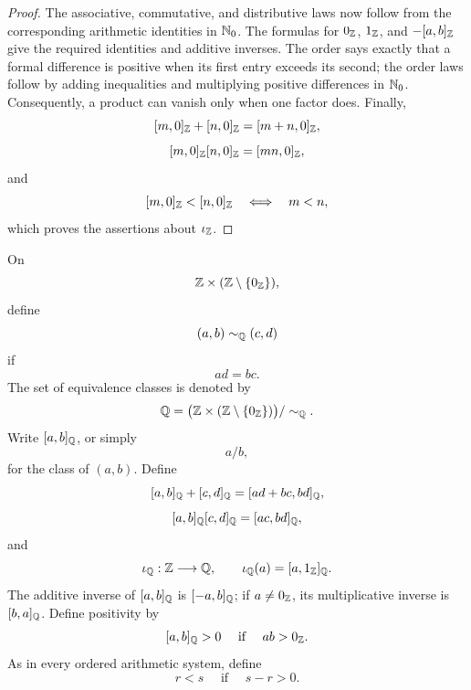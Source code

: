 \begin{proof}
The associative, commutative, and distributive laws now follow from the
corresponding arithmetic identities in \(\mathbb{N}_0\).  The formulas for
\(0_{\mathbb{Z}}\), \(1_{\mathbb{Z}}\), and \(-[a,b]_{\mathbb{Z}}\) give the required identities and
additive inverses.  The order says exactly that a formal difference is
positive when its first entry exceeds its second; the order laws follow by
adding inequalities and multiplying positive differences in \(\mathbb{N}_0\).
Consequently, a product can vanish only when one factor does.  Finally,
\[
[m,0]_{\mathbb{Z}}+[n,0]_{\mathbb{Z}}=[m+n,0]_{\mathbb{Z}},
\]
\[
[m,0]_{\mathbb{Z}}[n,0]_{\mathbb{Z}}=[mn,0]_{\mathbb{Z}},
\]
and
\[
[m,0]_{\mathbb{Z}}< [n,0]_{\mathbb{Z}}
\quad\Longleftrightarrow\quad
m<n,
\]
which proves the assertions about \(\iota_{\mathbb{Z}}\).
\end{proof}

\begin{definition}
On
\[
\mathbb{Z}\times(\mathbb{Z}\setminus\{0_{\mathbb{Z}}\}),
\]
define
\[
(a,b)\sim_{\mathbb{Q}}(c,d)
\]
if
\[
ad=bc.
\]
The set of equivalence classes is denoted by
\[
\mathbb{Q}=\bigl(\mathbb{Z}\times(\mathbb{Z}\setminus\{0_{\mathbb{Z}}\})\bigr)/\sim_{\mathbb{Q}}.
\]
Write \([a,b]_{\mathbb{Q}}\), or simply
\[
a/b,
\]
 for the class of \((a,b)\).
Define
\[
[a,b]_{\mathbb{Q}}+[c,d]_{\mathbb{Q}}=[ad+bc,bd]_{\mathbb{Q}},
\]
\[
[a,b]_{\mathbb{Q}}[c,d]_{\mathbb{Q}}=[ac,bd]_{\mathbb{Q}},
\]
and
\[
\iota_{\mathbb{Q}}:\mathbb{Z}\longrightarrow\mathbb{Q},
\qquad
\iota_{\mathbb{Q}}(a)=[a,1_{\mathbb{Z}}]_{\mathbb{Q}}.
\]
The additive inverse of \([a,b]_{\mathbb{Q}}\) is \([-a,b]_{\mathbb{Q}}\); if \(a\ne0_{\mathbb{Z}}\),
its multiplicative inverse is \([b,a]_{\mathbb{Q}}\).  Define positivity by
\[
[a,b]_{\mathbb{Q}}>0
\quad\text{ if }\quad
ab>0_{\mathbb{Z}}.
\]
As in every ordered arithmetic system, define
\[
r<s
\quad\text{ if }\quad
s-r>0.
\]
\end{definition}

